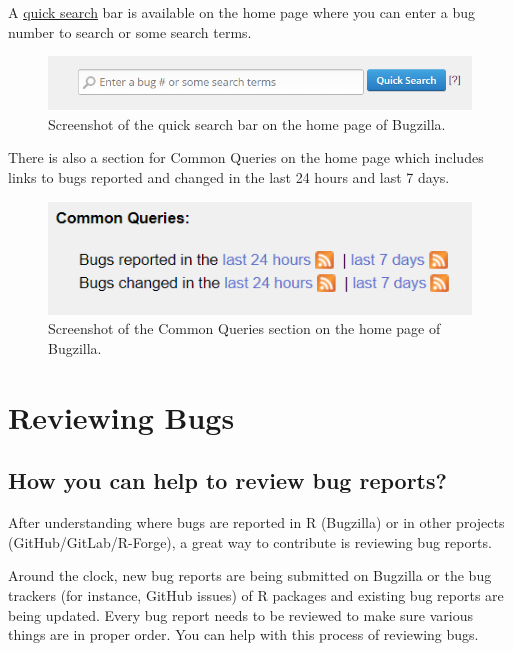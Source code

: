 \documentclass[
]{book}
\begin{document}
A \href{https://bugs.r-project.org/page.cgi?id=quicksearch.html}{quick search} bar is available on the home page where you can enter a bug number to search or some search terms.

\begin{figure}
\centering
\includegraphics{img/quicksearch.png}
\caption{Screenshot of the quick search bar on the home page of Bugzilla.}
\end{figure}

There is also a section for Common Queries on the home page which includes links to bugs reported and changed in the last 24 hours and last 7 days.

\begin{figure}
\centering
\includegraphics{img/commonquery.png}
\caption{Screenshot of the Common Queries section on the home page of Bugzilla.}
\end{figure}

\hypertarget{ReviewBugs}{%
\chapter{Reviewing Bugs}\label{ReviewBugs}}

\hypertarget{how-you-can-help-to-review-bug-reports}{%
\section{How you can help to review bug reports?}\label{how-you-can-help-to-review-bug-reports}}

After understanding where bugs are reported in R (Bugzilla) or in other projects (GitHub/GitLab/R-Forge), a great way to contribute is reviewing bug reports.

Around the clock, new bug reports are being submitted on Bugzilla or the bug trackers (for instance, GitHub issues) of R packages and existing bug reports are being updated. Every bug report needs to be reviewed to make sure various things are in proper order. You can help with this process of reviewing bugs.
\end{document}
